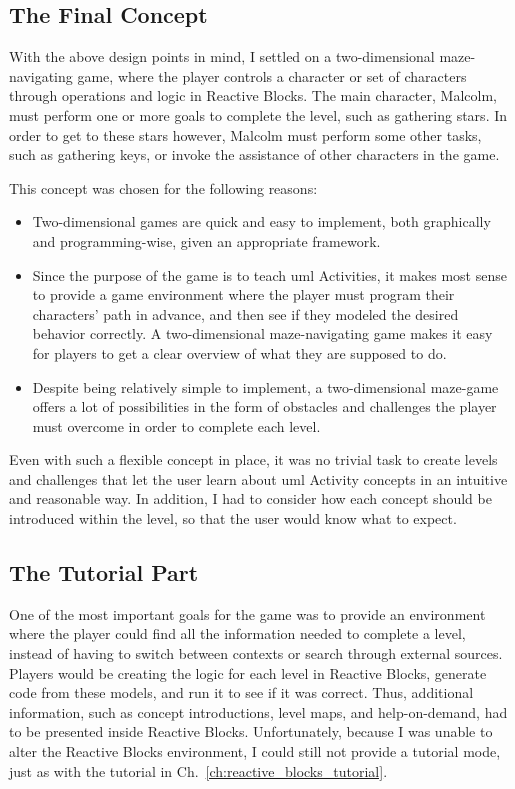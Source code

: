 \subsection{The Final Concept}
\label{sec:game_final_concept}
With the above design points in mind, I settled on a two-dimensional maze-navigating game, where the player controls a character or set of characters through operations and logic in Reactive Blocks. The main character, Malcolm, must perform one or more goals to complete the level, such as gathering stars. In order to get to these stars however, Malcolm must perform some other tasks, such as gathering keys, or invoke the assistance of other characters in the game.

\noindent
This concept was chosen for the following reasons:
\begin{itemize}
	\item Two-dimensional games are quick and easy to implement, both graphically and programming-wise, given an appropriate framework.
	\item Since the purpose of the game is to teach \gls{uml} Activities, it makes most sense to provide a game environment where the player must program their characters' path in advance, and then see if they modeled the desired behavior correctly. A two-dimensional maze-navigating game makes it easy for players to get a clear overview of what they are supposed to do.
	\item Despite being relatively simple to implement, a two-dimensional maze-game offers a lot of possibilities in the form of obstacles and challenges the player must overcome in order to complete each level.
\end{itemize}

\noindent
Even with such a flexible concept in place, it was no trivial task to create levels and challenges that let the user learn about \gls{uml} Activity concepts in an intuitive and reasonable way. In addition, I had to consider how each concept should be introduced within the level, so that the user would know what to expect.

\subsection{The Tutorial Part}
\label{sec:game_tutorial}
One of the most important goals for the game was to provide an environment where the player could find all the information needed to complete a level, instead of having to switch between contexts or search through external sources. Players would be creating the logic for each level in Reactive Blocks, generate code from these models, and run it to see if it was correct. Thus, additional information, such as concept introductions, level maps, and help-on-demand, had to be presented inside Reactive Blocks. Unfortunately, because I was unable to alter the Reactive Blocks environment, I could still not provide a tutorial mode, just as with the tutorial in Ch.~\ref{ch:reactive_blocks_tutorial}.


